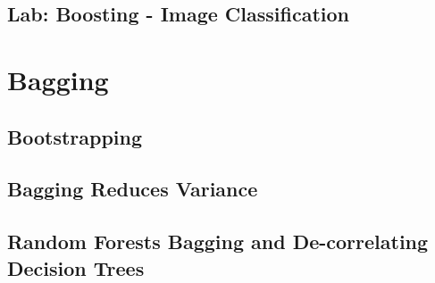         \subsection{Lab: Boosting - Image Classification}
        
    \section{Bagging}
        \subsection{Bootstrapping}
            \subsubsection{} %
        \subsection{Bagging Reduces Variance}
        \subsection{Random Forests Bagging and De-correlating Decision Trees}